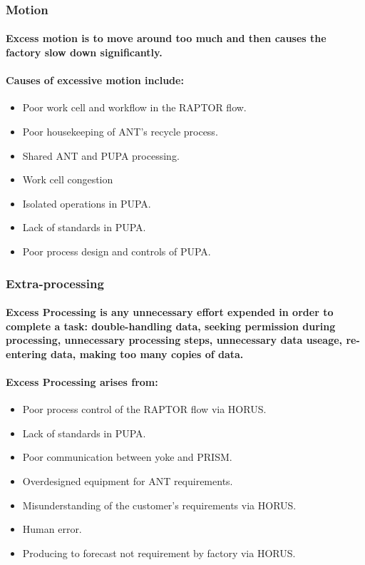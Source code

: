 \subsubsection{Motion}
\paragraph{Excess motion is to move around too much and then causes the factory slow down significantly.}
\paragraph{Causes of excessive motion include:}
\begin{itemize}
\item Poor work cell and workflow in the RAPTOR flow.
\item Poor housekeeping of ANT's recycle process.
\item Shared ANT and PUPA processing.
\item Work cell congestion
\item Isolated operations in PUPA.
\item Lack of standards in PUPA.
\item Poor process design and controls of PUPA.
\end{itemize}
\subsubsection{Extra-processing}
\paragraph{Excess Processing is any unnecessary effort expended in order to complete a task: double-handling data, seeking permission during processing, unnecessary processing steps, unnecessary data useage, re-entering data, making too many copies of data.}
\paragraph{Excess Processing arises from:}
\begin{itemize}
\item Poor process control of the RAPTOR flow via HORUS.
\item Lack of standards in PUPA.
\item Poor communication between yoke and PRISM.
\item Overdesigned equipment for ANT requirements.
\item Misunderstanding of the customer's requirements via HORUS.
\item Human error.
\item Producing to forecast not requirement by factory via HORUS.
\end{itemize}
